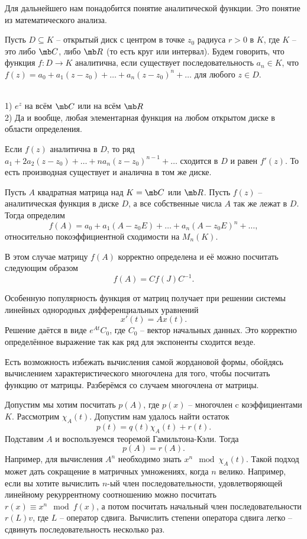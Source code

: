 Для дальнейшего нам понадобится понятие аналитической функции. Это понятие из математического анализа.


\dfn Пусть $D\subseteq K$ -- открытый диск с центром в точке $z_0$ радиуса $r>0$ в $K$, где $K$ -- это либо $\mb C$, либо $\mb R$ (то есть круг или интервал). Будем говорить, что функция $f\colon D \to K$ аналитична, если существует последовательность $a_n
\in K$, что $f(z)=a_0+a_1(z-z_0)+\dots+ a_n(z-z_0)^n+\dots$ для любого $ z\in D$. 
\edfn

\exm\\
1) $e^z$ на всём $\mb C$ или на всём $\mb R$\\
2) Да и вообще, любая элементарная функция на любом открытом диске в области определения.

\fct Если $f(z)$ аналитична в $D$, то ряд $a_1+2a_2(z-z_0)+\dots+na_n(z-z_0)^{n-1}+\dots$ сходится в $D$ и равен $f'(z)$. То есть производная существует и аналична в том же диске.
\efct

\dfn Пусть $A$ квадратная матрица над $K=\mb C$ или $\mb R$.  Пусть $f(z)$ -- аналитическая функция в диске $D$, а все собственные числа $A$ так же лежат в $D$. Тогда определим 
$$f(A)=a_0+a_1(A-z_0E)+\dots+a_n(A-z_0E)^n+\dots,$$
относительно покоэффициентной сходимости на $M_n(K)$.
\edfn






\rm  В этом случае матрицу $f(A)$ корректно определена и её можно посчитать следующим образом
$$f(A)= C f(J) C^{-1}.$$
\erm

\rm Особенную популярность функция от матриц получает при решении системы линейных однородных дифференциальных уравнений 
$$x'(t)=Ax(t).$$
Решение даётся в виде $e^{At}C_0$, где $C_0$ -- вектор начальных данных. Это корректно определённое выражение так как ряд для экспоненты сходится везде.
\erm

Есть возможность избежать вычисления самой жордановой формы, обойдясь вычислением характеристического многочлена для того, чтобы посчитать функцию от матрицы. Разберёмся со случаем многочлена от матрицы. 

Допустим мы хотим посчитать $p(A)$, где $p(x)$ -- многочлен c коэффициентами $K$. Рассмотрим $\chi_A(t)$. Допустим нам удалось найти остаток $$p(t)=q(t)\chi_A(t)+r(t).$$
Подставим $A$ и воспользуемся теоремой Гамильтона-Кэли. Тогда
$$p(A)=r(A).$$
Например, для вычисления $A^n$ необходимо знать $x^n \mod \chi_A(t)$. Такой подход может дать сокращение в матричных умножениях, когда $n$ велико. Например, если вы хотите вычислить $n$-ый член последовательности, удовлетворяющей линейному рекуррентному соотношению можно посчитать $r(x)\equiv x^n \mod f(x)$, а потом посчитать начальный член последовательности  $r(L)v$, где $L$ -- оператор сдвига. Вычислить степени оператора сдвига легко -- сдвинуть последовательность несколько раз.


